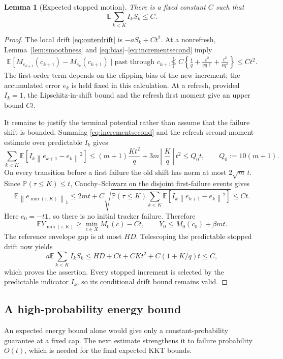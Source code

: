 \documentclass[11pt,a4paper]{article}
\newcommand{\E}{\mathbb E}
\newcommand{\Pp}{\mathbb P}
\newcommand{\norm}[1]{\left\lVert#1\right\rVert}
\newtheorem{lemma}[theorem]{Lemma}
\theoremstyle{remark}
\numberwithin{equation}{section}
\begin{document}
\begin{lemma}[Expected stopped motion]\label{lem:stoppedenergy}
There is a fixed constant $C$ such that
\begin{equation}
 \E\sum_{k<K}I_k S_k\le C.
 \label{eq:expectedS}
\end{equation}
\end{lemma}
\begin{proof}
The local drift \eqref{eq:outerdrift} is $-aS_k+Ct^2$. At a nonrefresh, Lemma~\ref{lem:smoothness} and \eqref{eq:bias}--\eqref{eq:incrementsecond} imply
\begin{align}
 \E[M_{e_{k+1}}(c_{k+1})-M_{e_k}(c_{k+1})\mid\text{past through }c_{k+1}]
 &\le C\left\{\frac tq+\frac{t^2}{\nu q\ell}+\frac{t^2}{\nu q^2}\right\}
 \le Ct^2.\label{eq:potentialincrement}
\end{align}
The first-order term depends on the clipping bias of the new increment; the accumulated error $e_k$ is held fixed in this calculation. At a refresh, provided $I_k=1$, the Lipschitz-in-shift bound and the refresh first moment give an upper bound $Ct$.

It remains to justify the terminal potential rather than assume that the failure shift is bounded. Summing \eqref{eq:incrementsecond} and the refresh second-moment estimate over predictable $I_k$ gives
\begin{equation}
 \sum_{k<K}\E\left[I_k\norm{e_{k+1}-e_k}^2\right]
 \le (m+1)\frac{Kt^2}{q}
 +3m\left\lfloor\frac Kq\right\rfloor t^2
 \le Q_0t,\qquad Q_0:=10(m+1).
 \label{eq:totalshiftvariance}
\end{equation}
On every transition before a first failure the old shift has norm at most $2\sqrt m\,t$. Since $\Pp(\tau\le K)\le t$, Cauchy--Schwarz on the disjoint first-failure events gives
\[
 \E\norm{e_{\min(\tau,K)}}_1
 \le2mt+C\sqrt{\Pp(\tau\le K)\sum_{k<K}\E[I_k\norm{e_{k+1}-e_k}^2]}
 \le Ct.
\]
Here $e_0=-t\mathbf1$, so there is no initial tracker failure. Therefore
\[
 \E Y_{\min(\tau,K)}\ge\min_{c\in X}M_0(c)-Ct,
 \qquad Y_0\le M_0(c_0)+\beta mt.
\]
The reference envelope gap is at most $HD$. Telescoping the predictable stopped drift now yields
\[
 a\E\sum_{k<K}I_kS_k
 \le HD+Ct+CKt^2+C(1+K/q)t\le C,
\]
which proves the assertion. Every stopped increment is selected by the predictable indicator $I_k$, so its conditional drift bound remains valid.
\end{proof}

\subsection{A high-probability energy bound}
An expected energy bound alone would give only a constant-probability guarantee at a fixed cap. The next estimate strengthens it to failure probability $O(t)$, which is needed for the final expected KKT bounds.
\end{document}
